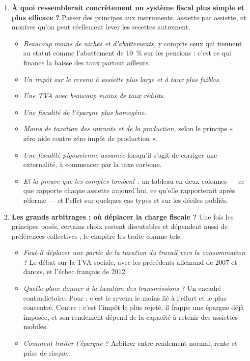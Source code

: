 \documentclass[11pt,a4paper]{article}
\newenvironment{chapitres}[1]
{\begin{enumerate}[leftmargin=1.6em,itemsep=0.15em,parsep=0pt,topsep=0.20em,start=#1]}
{\end{enumerate}}
\newenvironment{args}
{\begin{itemize}[leftmargin=1.1em,itemsep=0.1em,parsep=0pt,topsep=0.12em,label=\textbullet]}
{\end{itemize}}
\begin{document}
\begin{chapitres}{7}
\item \textbf{À quoi ressemblerait concrètement un système fiscal plus simple et plus efficace ?}
Passer des principes aux instruments, assiette par assiette, et montrer qu'on peut réellement lever
les recettes autrement.
\begin{args}
\item \emph{Beaucoup moins de niches et d'abattements,} y compris ceux qui tiennent au statut comme
l'abattement de 10~\% sur les pensions : c'est ce qui finance la baisse des taux partout ailleurs.
\item \emph{Un impôt sur le revenu à assiette plus large et à taux plus faibles.}
\item \emph{Une TVA avec beaucoup moins de taux réduits.}
\item \emph{Une fiscalité de l'épargne plus homogène.}
\item \emph{Moins de taxation des intrants et de la production,} selon le principe « zéro aide contre
zéro impôt de production ».
\item \emph{Une fiscalité pigouvienne assumée} lorsqu'il s'agit de corriger une externalité, à
commencer par la taxe carbone.
\item \emph{Et la preuve que les comptes tombent :} un tableau en deux colonnes --- ce que rapporte
chaque assiette aujourd'hui, ce qu'elle rapporterait après réforme --- et l'effet sur quelques cas
types et sur les déciles publiés.
\end{args}
\item \textbf{Les grands arbitrages : où déplacer la charge fiscale ?} Une fois les principes posés,
certains choix restent discutables et dépendent aussi de préférences collectives ; le chapitre les
traite comme tels.
\begin{args}
\item \emph{Faut-il déplacer une partie de la taxation du travail vers la consommation ?} Le débat sur
la TVA sociale, avec les précédents allemand de 2007 et danois, et l'échec français de 2012.
\item \emph{Quelle place donner à la taxation des transmissions ?} Un encadré contradictoire. Pour :
c'est le revenu le moins lié à l'effort et le plus concentré. Contre : c'est l'impôt le plus rejeté,
il frappe une épargne déjà imposée, et son rendement dépend de la capacité à retenir des assiettes
mobiles.
\item \emph{Comment traiter l'épargne ?} Arbitrer entre rendement normal, rente et prise de risque.

\end{args}
\end{chapitres}
\end{document}
